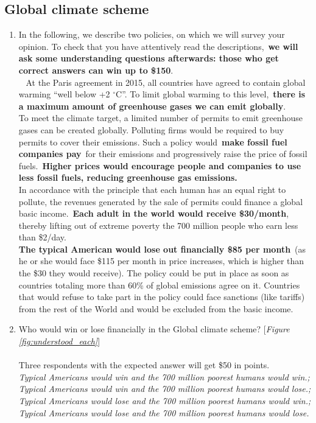 \subsection*{Global climate scheme}
\begin{enumerate}[resume] \item[] In the following, we describe two policies, on which we will survey your opinion. To check that you have attentively read the descriptions,~\textbf{we will ask some understanding questions afterwards: those who get correct answers can win up to \$150}. \\
\textbf{}~ At the Paris agreement in 2015, all countries have agreed to contain global warming ``well below +2 $\mathrm{{}^\circ}$C''. To limit global warming to this level,~\textbf{there is a maximum amount of greenhouse gases we can emit globally}.\\
To meet the climate target, a limited number of permits to emit greenhouse gases can be created globally. Polluting firms would be required to buy permits to cover their emissions. Such a policy would~\textbf{make fossil fuel companies pay}~for their emissions and progressively raise the price of fossil fuels.~\textbf{Higher prices would encourage people and companies to use less fossil fuels, reducing greenhouse gas emissions.}\\
In accordance with the principle that each human has an equal right to pollute, the revenues generated by the sale of permits could finance a global basic income.~\textbf{Each adult in the world would receive \$30/month}, thereby lifting out of extreme poverty the 700 million people who earn less than \$2/day.\\
\textbf{The typical American would lose out financially \$85 per month}~(as he or she would face \$115 per month in price increases, which is higher than the \$30 they would receive). The policy could be put in place as soon as countries totaling more than 60\% of global emissions agree on it. Countries that would refuse to take part in the policy could face sanctions (like tariffs) from the rest of the World and would be excluded from the basic income.
\item \label{q:understood_gcs} Who would win or lose financially in the Global climate scheme? [\textit{Figure \ref{fig:understood_each}}] \\
\\
Three respondents with the expected answer will get \$50 in points.
\\ \textit{Typical Americans would win and the 700 million poorest humans would win.; Typical Americans would win and the 700 million poorest humans would lose.; Typical Americans would lose and the 700 million poorest humans would win.; Typical Americans would lose and the 700 million poorest humans would lose.}

\end{enumerate}
